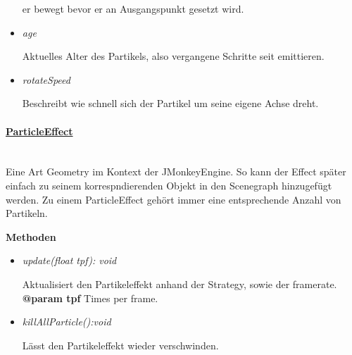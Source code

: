 \begin{itemize}
\begin{leftbar}[0.9\linewidth]
                        er bewegt bevor er an Ausgangspunkt gesetzt wird.   
                        \end{leftbar}
                    \item \textit{age}
                        \begin{leftbar}[0.9\linewidth]
                        Aktuelles Alter des Partikels, also vergangene Schritte seit emittieren.   
                        \end{leftbar}
                    \item \textit{rotateSpeed}
                        \begin{leftbar}[0.9\linewidth]
                        Beschreibt wie schnell sich der Partikel um seine eigene Achse dreht.  
                        \end{leftbar}
                \end{itemize}

                \paragraph{\underline{ParticleEffect}}\mbox{}\\
                    Eine Art Geometry im Kontext der JMonkeyEngine. So kann der Effect später einfach
                    zu seinem korrespndierenden Objekt in den Scenegraph hinzugefügt werden.
                    Zu einem ParticleEffect gehört immer eine entsprechende Anzahl von Partikeln.
                    \par

                    \textbf{Methoden}
                    \begin{itemize}
                        \item \textit{update(float tpf): void}
                            \begin{leftbar}[0.9\linewidth]
                            Aktualisiert den Partikeleffekt anhand der Strategy, sowie der framerate.  \\ 
                            \textbf{@param tpf} Times per frame.\\
                            \end{leftbar}
                        \item \textit{killAllParticle():void}
                            \begin{leftbar}[0.9\linewidth]
                            Lässt den Partikeleffekt wieder verschwinden.  
                            \end{leftbar}
                    \end{itemize}

